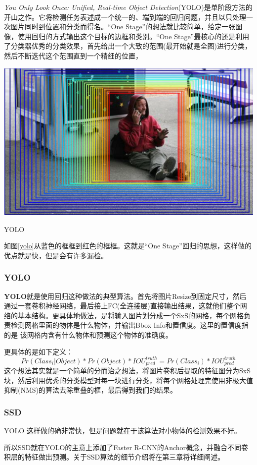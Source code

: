 \textit{You Only Look Once: Unified, Real-time Object Detection}(YOLO)\cite{yolo}是单阶段方法的开山之作。它将检测任务表述成一个统一的、端到端的回归问题，并且以只处理一次图片同时到位置和分类而得名。“One Stage”的想法就比较简单，给定一张图像，使用回归的方式输出这个目标的边框和类别。“One Stage”最核心的还是利用了分类器优秀的分类效果，首先给出一个大致的范围(最开始就是全图)进行分类，然后不断迭代这个范围直到一个精细的位置，
\begin{uscfigure}
	\includegraphics[width=\textwidth]{./Pictures/od_regressor.png}	
	\caption{YOLO}
	\label{yolo}
\end{uscfigure}
如图\ref{yolo}从蓝色的框框到红色的框框。这就是“One Stage”回归的思想，这样做的优点就是快，但是会有许多漏检。

\subsubsection{YOLO}
\textbf{YOLO}就是使用回归这种做法的典型算法。首先将图片Resize到固定尺寸，然后通过一套卷积神经网络，最后接上FC(全连接层)直接输出结果，这就他们整个网络的基本结构。更具体地做法，是将输入图片划分成一个SxS的网格，每个网格负责检测网格里面的物体是什么物体，并输出Bbox Info和置信度。这里的置信度指的是 该网格内含有什么物体和预测这个物体的准确度。

更具体的是如下定义：
\[
	Pr(Class_i | Object) * Pr(Object) * IOU_{pred}^{truth} = Pr(Class_i) * IOU_{pred}^{truth}
\]
这个想法其实就是一个简单的分而治之想法，将图片卷积后提取的特征图分为SxS块，然后利用优秀的分类模型对每一块进行分类，将每个网格处理完使用非极大值抑制(NMS)的算法去除重叠的框，最后得到我们的结果。
\subsubsection{SSD}
YOLO 这样做的确非常快，但是问题就在于该算法对小物体的检测效果不好。

所以SSD就在YOLO的主意上添加了Faster R-CNN的Anchor概念，并融合不同卷积层的特征做出预测。关于SSD算法的细节介绍将在第三章将详细阐述。
